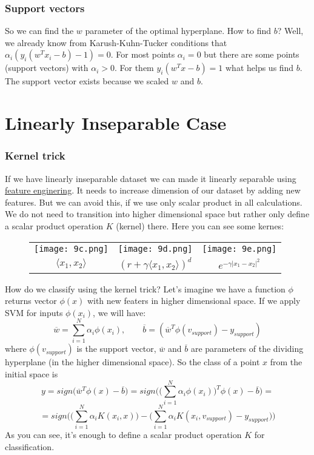 \subsubsection*{Support vectors}

So we can find the $w$ parameter of the optimal hyperplane. How to find $b$? Well, we already know from Karush-Kuhn-Tucker conditions that $\alpha_i(y_i(w^Tx_i-b)-1)=0$. For most points $\alpha_i=0$ but there are some points (support vectors) with $\alpha_i>0$. For them $y_i(w^Tx-b)=1$ what helps us find $b$. The support vector exists because we scaled $w$ and $b$.

\pagebreak
\section{Linearly Inseparable Case}
\vspace{-0.6cm}
\subsubsection*{Kernel trick}

If we have linearly inseparable dataset we can made it linearly separable using \hyperlink{new_features}{feature enginering}. It needs to increase dimension of our dataset by adding new features. But we can avoid this, if we use only scalar product in all calculations. We do not need to transition into higher dimensional space but rather only
define a scalar product operation $K$ (kernel) there. Here you can see some kernes:\\
\begin{figure}[h]
  \centering
  \begin{tabular}{ccc}
    \texttt{[image: 9c.png]} & \hspace{0.5cm}
    \texttt{[image: 9d.png]} & \hspace{0.5cm}
    \texttt{[image: 9e.png]} \\
    $\langle x_1,x_2\rangle$ & $(r+\gamma\langle x_1,x_2\rangle)^d$ & $e^{-\gamma|x_1-x_2|^2}$ \\
  \end{tabular}
\end{figure}
How do we classify using the kernel trick? Let's imagine we have a function $\phi$ returns vector $\phi(x)$ with new featers in higher dimensional space. If we apply SVM for inputs $\phi(x_i)$, we will have:
$$\overline{w}=\sum\limits_{i=1}^{N}\alpha_i\phi(x_i),\qquad\overline{b}=(\overline{w}^T\phi(v_{support})-y_{support})$$
where $\phi(v_{support})$ is the support vector, $\overline{w}$ and $\overline{b}$ are parameters of the dividing hyperplane (in the higher dimensional space). So the class of a point $x$ from the initial space is
$$y=sign\big(\overline{w}^T\phi(x)-\overline{b}\big)=sign\big(\Big(\sum\limits_{i=1}^{N}\alpha_i \phi(x_i)\Big)^T\phi(x)-\overline{b}\big)=$$
$$=sign\big(\Big(\sum\limits_{i=1}^{N}\alpha_iK(x_i,x)\Big)-\Big(\sum\limits_{i=1}^{N}\alpha_iK(x_i,v_{support})-y_{support}\Big)\big)$$
As you can see, it's enough to define a scalar product operation $K$ for classification.

